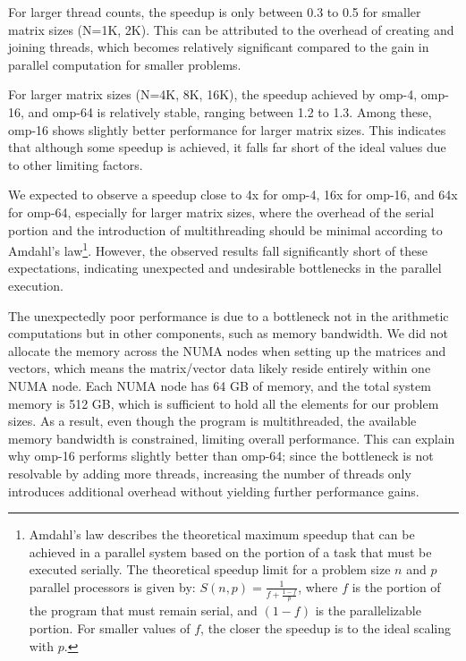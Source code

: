 For larger thread counts, the speedup is only between 0.3 to 0.5 for smaller matrix sizes (N=1K, 2K). This can be attributed to the overhead of creating and joining threads, which becomes relatively significant compared to the gain in parallel computation for smaller problems.

For larger matrix sizes (N=4K, 8K, 16K), the speedup achieved by omp-4, omp-16, and omp-64 is relatively stable, ranging between 1.2 to 1.3. Among these, omp-16 shows slightly better performance for larger matrix sizes. This indicates that although some speedup is achieved, it falls far short of the ideal values due to other limiting factors.

We expected to observe a speedup close to 4x for omp-4, 16x for omp-16, and 64x for omp-64, especially for larger matrix sizes, where the overhead of the serial portion and the introduction of multithreading should be minimal according to Amdahl's law\cite{amdahl1967validity}\footnote{Amdahl's law describes the theoretical maximum speedup that can be achieved in a parallel system based on the portion of a task that must be executed serially. The theoretical speedup limit for a problem size \(n\) and \(p\) parallel processors is given by: \( S(n, p) = \frac{1}{f + \frac{1-f}{p}} \), where \(f\) is the portion of the program that must remain serial, and \((1-f)\) is the parallelizable portion. For smaller values of \(f\), the closer the speedup is to the ideal scaling with \(p\).}. However, the observed results fall significantly short of these expectations, indicating unexpected and undesirable bottlenecks in the parallel execution.

The unexpectedly poor performance is due to a bottleneck not in the arithmetic computations but in other components, such as memory bandwidth. We did not allocate the memory across the NUMA nodes when setting up the matrices and vectors, which means the matrix/vector data likely reside entirely within one NUMA node. Each NUMA node has 64 GB of memory, and the total system memory is 512 GB, which is sufficient to hold all the elements for our problem sizes. As a result, even though the program is multithreaded, the available memory bandwidth is constrained, limiting overall performance. This can explain why omp-16 performs slightly better than omp-64; since the bottleneck is not resolvable by adding more threads, increasing the number of threads only introduces additional overhead without yielding further performance gains.

